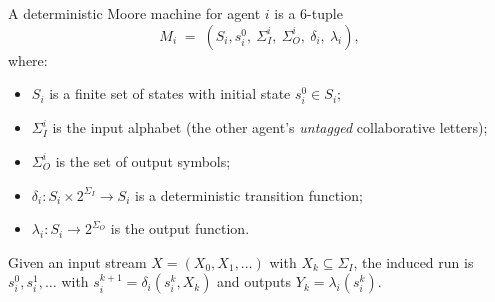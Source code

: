   
  \begin{definition}
  \label{def:moore}
  A deterministic Moore machine for agent $i$ is a 6-tuple
  \[
  M_i \;=\; (S_i, s^0_i,\ \Sigma_I^i,\ \Sigma_O^i,\ \delta_i,\ \lambda_i),
  \]
  where:
  \begin{itemize}
    \item $S_i$ is a finite set of states with initial state $s^0_i\in S_i$;
    \item $\Sigma_I^i$ is the input alphabet (the other agent’s \emph{untagged} collaborative letters);
    \item $\Sigma_O^i$ is the set of output symbols;
    \item $\delta_i: S_i \times 2^{\Sigma_I} \to S_i$ is a deterministic transition function;
    \item $\lambda_i: S_i \to 2^{\Sigma_O}$ is the output function.
  \end{itemize}
  Given an input stream $X=(X_0,X_1,\dots)$ with $X_k\subseteq\Sigma_I$, the induced run is
  $s^0_i,s^1_i,\dots$ with $s^{k+1}_i=\delta_i(s^k_i,X_k)$ and outputs $Y_k=\lambda_i(s^k_i)$.
  \end{definition}
  

